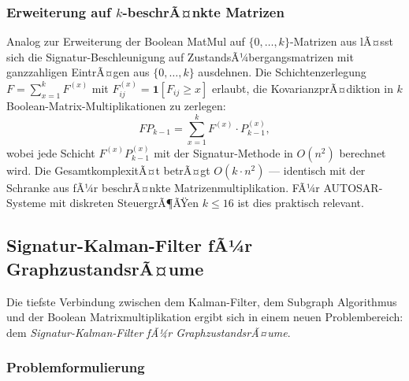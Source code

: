 ﻿\documentclass[a4paper,12pt]{article}
\theoremstyle{definition}
\begin{document}
\subsubsection{Erweiterung auf $k$-beschrÃ¤nkte Matrizen}

Analog zur Erweiterung der Boolean MatMul auf $\{0,\ldots,k\}$-Matrizen aus
\cite{epp2026boolmm} lÃ¤sst sich die Signatur-Beschleunigung auf ZustandsÃ¼bergangs\-matrizen
mit ganzzahligen EintrÃ¤gen aus $\{0,\ldots,k\}$ ausdehnen. Die Schichtenzerlegung
$F = \sum_{x=1}^k F^{(x)}$ mit $F^{(x)}_{ij} = \mathbf{1}[F_{ij} \geq x]$ erlaubt,
die KovarianzprÃ¤diktion in $k$ Boolean-Matrix-Multiplikationen zu zerlegen:
\[
    F P_{k-1} = \sum_{x=1}^k F^{(x)} \cdot P_{k-1}^{(x)},
\]
wobei jede Schicht $F^{(x)} P_{k-1}^{(x)}$ mit der Signatur-Methode in $O(n^2)$
berechnet wird. Die GesamtkomplexitÃ¤t betrÃ¤gt $O(k \cdot n^2)$ --- identisch mit
der Schranke aus \cite{epp2026boolmm} fÃ¼r beschrÃ¤nkte Matrizenmultiplikation.
FÃ¼r AUTOSAR-Systeme mit diskreten SteuergrÃ¶ÃŸen $k \leq 16$ ist dies praktisch relevant.

\subsection{Signatur-Kalman-Filter fÃ¼r GraphzustandsrÃ¤ume}

Die tiefste Verbindung zwischen dem Kalman-Filter, dem Subgraph Algorithmus
\cite{epp2026} und der Boolean Matrixmultiplikation \cite{epp2026boolmm} ergibt
sich in einem neuen Problembereich: dem \emph{Signatur-Kalman-Filter fÃ¼r GraphzustandsrÃ¤ume}.

\subsubsection{Problemformulierung}
\end{document}
